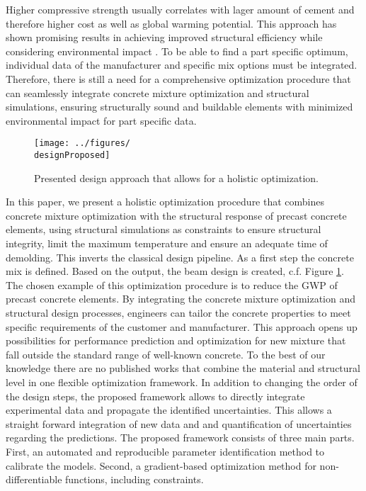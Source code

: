 Higher compressive strength usually correlates with lager amount of cement and therefore higher cost as well as global warming potential.
This approach has shown promising results in achieving improved structural efficiency while considering environmental impact \cite{dos_Santos_2023}.
To be able to find a part specific optimum, individual data of the manufacturer and specific mix options must be integrated.
Therefore, there is still a need for a comprehensive optimization procedure that can seamlessly integrate concrete mixture optimization and structural simulations, ensuring structurally sound and buildable elements with minimized environmental impact for part specific data.
\\
\begin{figure}[b]%
	\centering
	\texttt{[image: ../figures/\\designProposed]}
	\caption{Presented design approach that allows for a holistic optimization.}\label{fig:proposed_workflow}
\end{figure}
In this paper, we present a holistic optimization procedure that combines concrete mixture optimization with the structural response of precast concrete elements, using structural simulations as constraints to ensure structural integrity, limit the maximum temperature and ensure an adequate time of demolding.
This inverts the classical design pipeline.
As a first step the concrete mix is defined.
Based on the output, the beam design is created, c.f. Figure \ref{fig:proposed_workflow}.
The chosen example of this optimization procedure is to reduce the GWP of precast concrete elements. 
By integrating the concrete mixture optimization and structural design processes, engineers can tailor the concrete properties to meet specific requirements of the customer and manufacturer.
This approach opens up possibilities for performance prediction and optimization for new mixture that fall outside the standard range of well-known concrete.
To the best of our knowledge there are no published works that combine the material and structural level in one flexible optimization framework.
In addition to changing the order of the design steps, the proposed framework allows to directly integrate experimental data and propagate the identified uncertainties.
This allows a straight forward integration of new data and and quantification of uncertainties regarding the predictions.
The proposed framework consists of three main parts.
First, an automated and reproducible parameter identification method to calibrate the models.
Second, a gradient-based optimization method for non-differentiable functions, including constraints.
